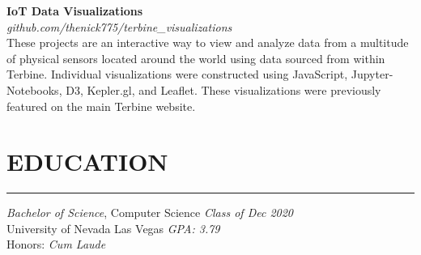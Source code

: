 \documentclass{res}
\begin{document}
\begin{resume}
\vspace{-4pt}

		{\bf IoT Data Visualizations} \\
    \emph{github.com/thenick775/terbine\_visualizations} \hfill \vspace{4pt}\\
			These projects are an interactive way to view and analyze data from a multitude of physical sensors located around the world using data sourced from within Terbine. Individual visualizations were constructed using JavaScript, Jupyter-Notebooks, D3, Kepler.gl, and Leaflet. These visualizations were previously featured on the main Terbine website.

\vspace{-3pt}

\vspace{-4pt}

		\section{{EDUCATION}}
    \noindent\rule[0.5ex]{\linewidth}{1pt}
		{\sl Bachelor of Science}, Computer Science \hfill \emph{Class of Dec 2020} \\
		University of Nevada Las Vegas \hfill \emph{GPA: 3.79} \\ Honors: \hfill \emph{Cum Laude} \\ \vspace{-5mm}


\end{resume}
\end{document}
